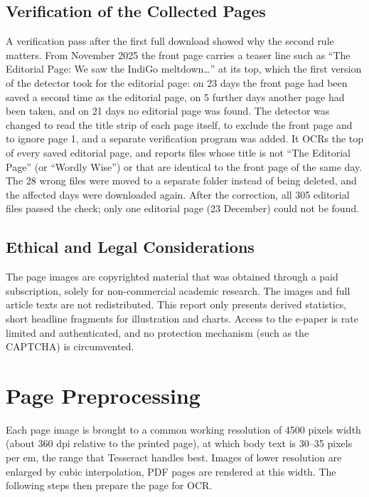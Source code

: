 \subsection{Verification of the Collected Pages}
\label{sec:verify}
A verification pass after the first full download showed why the second rule matters. From November 2025 the front page carries a teaser line such as ``The Editorial Page: We saw the IndiGo meltdown\ldots'' at its top, which the first version of the detector took for the editorial page: on 23 days the front page had been saved a second time as the editorial page, on 5 further days another page had been taken, and on 21 days no editorial page was found. The detector was changed to read the title strip of each page itself, to exclude the front page and to ignore page 1, and a separate verification program was added. It OCRs the top of every saved editorial page, and reports files whose title is not ``The Editorial Page'' (or ``Wordly Wise'') or that are identical to the front page of the same day. The 28 wrong files were moved to a separate folder instead of being deleted, and the affected days were downloaded again. After the correction, all 305 editorial files passed the check; only one editorial page (23 December) could not be found.

\subsection{Ethical and Legal Considerations}
The page images are copyrighted material that was obtained through a paid subscription, solely for non-commercial academic research. The images and full article texts are not redistributed. This report only presents derived statistics, short headline fragments for illustration and charts. Access to the e-paper is rate limited and authenticated, and no protection mechanism (such as the CAPTCHA) is circumvented.

\section{Page Preprocessing}
\label{sec:preprocess}

Each page image is brought to a common working resolution of 4500 pixels width (about 360 dpi relative to the printed page), at which body text is 30--35 pixels per em, the range that Tesseract handles best. Images of lower resolution are enlarged by cubic interpolation, PDF pages are rendered at this width. The following steps then prepare the page for OCR.

